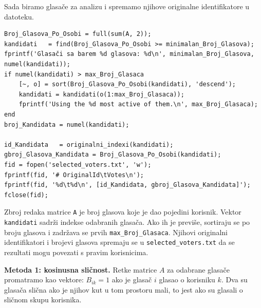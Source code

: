 \documentclass[12pt, letterpaper]{article}
\numberwithin{figure}{section}
\begin{document}
Sada biramo glasače za analizu i spremamo njihove originalne identifikatore u datoteku.

\begin{lstlisting}[style=octave, caption={Odabir najaktivnijih glasača}, label={lst:wiki_odabir}]
Broj_Glasova_Po_Osobi = full(sum(A, 2));
kandidati   = find(Broj_Glasova_Po_Osobi >= minimalan_Broj_Glasova);
fprintf('Glasači sa barem %d glasova: %d\n', minimalan_Broj_Glasova, numel(kandidati));
if numel(kandidati) > max_Broj_Glasaca
    [~, o] = sort(Broj_Glasova_Po_Osobi(kandidati), 'descend');
    kandidati = kandidati(o(1:max_Broj_Glasaca));
    fprintf('Using the %d most active of them.\n', max_Broj_Glasaca);
end
broj_Kandidata = numel(kandidati);

id_Kandidata   = originalni_indexi(kandidati);
gbroj_Glasova_Kandidata = Broj_Glasova_Po_Osobi(kandidati);
fid = fopen('selected_voters.txt', 'w');
fprintf(fid, '# OriginalId\tVotes\n');
fprintf(fid, '%d\t%d\n', [id_Kandidata, gbroj_Glasova_Kandidata]');
fclose(fid);

\end{lstlisting}
Zbroj redaka matrice \texttt{A} je broj glasova koje je dao pojedini korisnik. Vektor \texttt{kandidati} sadrži indekse odabranih glasača. Ako ih je previše, sortiraju se po broju glasova i zadržava se prvih \texttt{max\_Broj\_Glasaca}. Njihovi originalni identifikatori i brojevi glasova spremaju se u \texttt{selected\_voters.txt} da se rezultati mogu povezati s pravim korisnicima.

\textbf{Metoda 1: kosinusna sličnost.} Retke matrice $A$ za odabrane glasače promatramo kao vektore: $B_{ik}=1$ ako je glasač $i$ glasao o korisniku $k$. Dva su glasača slična ako je njihov kut u tom prostoru mali, to jest ako su glasali o sličnom skupu korisnika.
\end{document}
